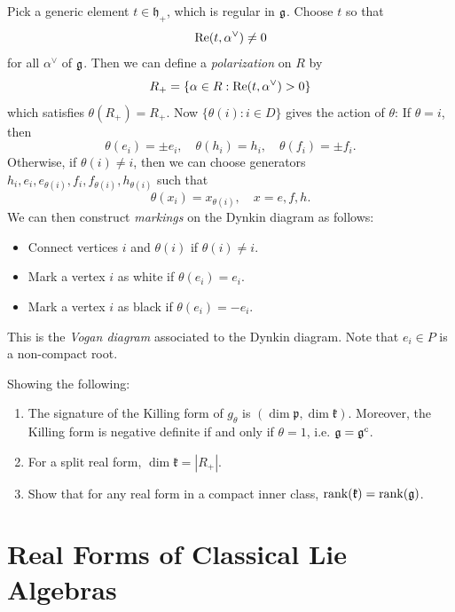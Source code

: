 \begin{remark}
  Pick a generic element $t \in \mathfrak{h}_+$,
  which is regular in $\mathfrak{g}$. Choose $t$
  so that
  \[
    \operatorname{Re}(t, \alpha^\vee)
    \ne 0
  \]
  for all $\alpha^\vee$ of $\mathfrak{g}$. Then
  we can define a \emph{polarization}
  on $R$ by
  \[
    R_+ = \{\alpha \in R : \operatorname{Re}(t, \alpha^\vee) > 0\}
  \]
  which satisfies $\theta(R_+) = R_+$.
  Now $\{\theta(i) : i \in D\}$ gives the
  action of $\theta$: If $\theta = i$, then
  \[
    \theta(e_i) = \pm e_i, \quad
    \theta(h_i) = h_i, \quad
    \theta(f_i) = \pm f_i.
  \]
  \pagebreak
  Otherwise, if $\theta(i) \ne i$,
  then we can choose generators
  $h_i, e_i, e_{\theta(i)}, f_i, f_{\theta(i)}, h_{\theta(i)}$
  such that
  \[
    \theta(x_i) = x_{\theta(i)}, \quad
    x = e, f, h.
  \]
  We can then construct \emph{markings}
  on the Dynkin diagram as follows:
  \begin{itemize}
    \item Connect vertices $i$ and
      $\theta(i)$ if $\theta(i) \ne i$.
    \item Mark a vertex $i$ as white if
      $\theta(e_i) = e_i$.
    \item Mark a vertex $i$ as black if
      $\theta(e_i) = -e_i$.
  \end{itemize}
  This is the \emph{Vogan diagram}
  associated to the Dynkin diagram.
  Note that $e_i \in P$ is a non-compact root.
\end{remark}

\begin{exercise}
  Showing the following:
  \begin{enumerate}
    \item The signature of the Killing
      form of $g_\theta$ is
      $(\dim \mathfrak{p}, \dim \mathfrak{k})$.
      Moreover, the Killing form is
      negative definite if and only if
      $\theta = 1$, i.e. $\mathfrak{g} = \mathfrak{g}^c$.
    \item For a split real form,
      $\dim \mathfrak{k} = |R_+|$.
    \item Show that for any real form
      in a compact inner class,
      $\operatorname{rank}(\mathfrak{k}) = \operatorname{rank}(\mathfrak{g})$.
  \end{enumerate}
\end{exercise}

\section{Real Forms of Classical Lie Algebras}

